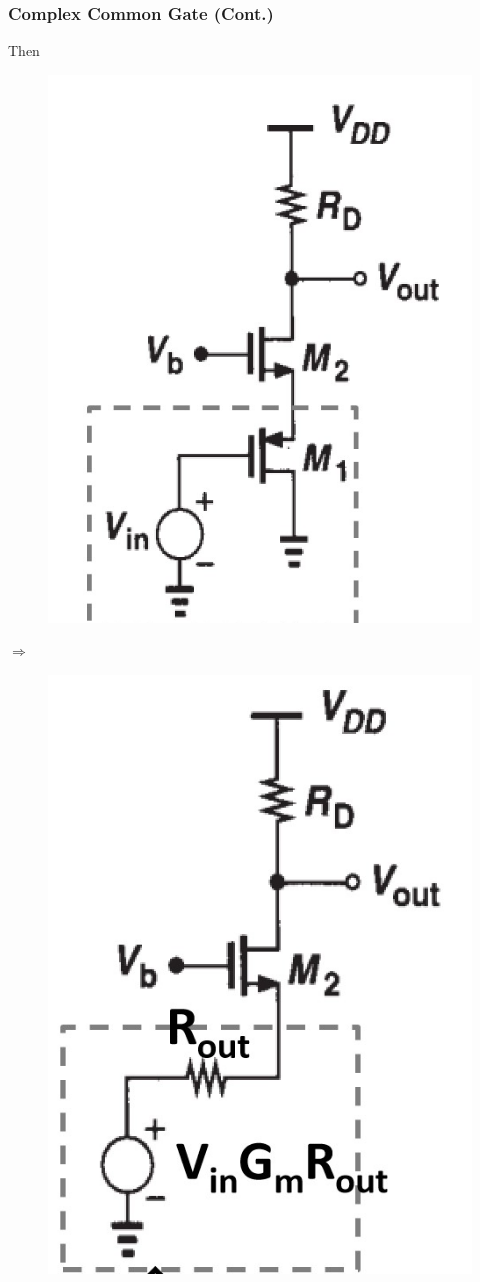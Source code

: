 \documentclass{beamer}
\begin{document}
\begin{frame}
    \frametitle{Complex Common Gate (Cont.)}
    Then
    \begin{minipage}{0.3\linewidth}
        \begin{figure}[H]
            \centering
            \includegraphics[width=0.8\linewidth]{common-gate2.png}
        \end{figure}
    \end{minipage}
    $\Rightarrow $
    \begin{minipage}{0.3\linewidth}
        \begin{figure}[H]
            \centering
            \includegraphics[width=0.7\linewidth]{common-gate3}

\end{figure}
\end{minipage}
\end{frame}
\end{document}
